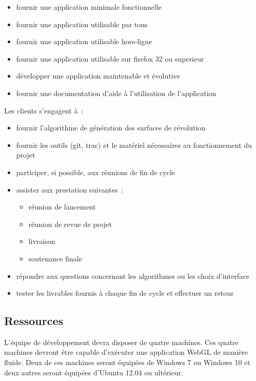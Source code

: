 \documentclass{scrartcl}
\begin{document}
		\medskip
		
		\begin{itemize}
			\item fournir une application minimale fonctionnelle
			\item fournir une application utilisable par tous
			\item fournir une application utilisable hors-ligne
			\item fournir une application utilisable sur firefox 32 ou superieur
			\item développer une application maintenable et évolutive
			\item fournir une documentation d'aide à l'utilisation de l'application
		\end{itemize}
		
		\bigskip %
		
		Les clients s'engagent à~:
			
		\medskip
		
		\begin{itemize}
			\item fournir l'algorithme de génération des surfaces de révolution
			\item fournir les outils (git, trac) et le matériel nécessaires au fonctionnement du projet
			\item participer, si possible, aux réunions de fin de cycle
			\item assister aux prestation suivantes~:
				\begin{itemize} 
					\item[\textasteriskcentered] réunion de lancement
					\item[\textasteriskcentered] réunion de revue de projet
					\item[\textasteriskcentered] livraison
					\item[\textasteriskcentered] soutenance finale
				\end{itemize}
			\item répondre aux questions concernant les algorithmes ou les choix d'interface
			\item tester les livrables fournis à chaque fin de cycle et effectuer un retour
		\end{itemize}  


	\subsection{Ressources}
		L'équipe de développement devra disposer de quatre machines. Ces quatre machines devront être capable d'exécuter une application WebGL de manière fluide.
		Deux de ces machines seront équipées de Windows 7 ou Windows 10 et deux autres seront équipées d'Ubuntu 12.04 ou ultérieur.
\end{document}
